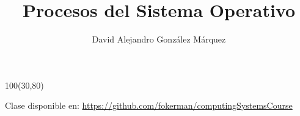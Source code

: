 \documentclass[aspectratio=169]{beamer}
\title{\Huge Procesos del Sistema Operativo}
\author{David Alejandro González Márquez}
\date{}
\begin{document}
\begin{frame}[plain]
    \titlepage
    \begin{textblock}{100}(30,80)
    \begin{tcolorbox}[size=small,width=\textwidth,colback={gray!30},title={}]
    \begin{center}
     \scriptsize Clase disponible en: \url{https://github.com/fokerman/computingSystemsCourse}
    \end{center}
    \end{tcolorbox}
    \end{textblock}
\end{frame}
\end{document}
